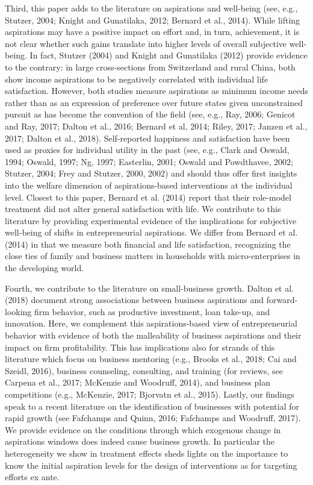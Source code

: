 \documentclass[11.5pt]{article}
\begin{document}
Third, this paper adds to the literature on aspirations and well-being (see, e.g., Stutzer, 2004; Knight and Gunatilaka, 2012; Bernard et al., 2014). While lifting aspirations may have a positive impact on effort and, in turn, achievement, it is not clear whether such gains translate into higher levels of overall subjective well-being. In fact, Stutzer (2004) and Knight and Gunatilaka (2012) provide evidence to the contrary: in large cross-sections from Switzerland and rural China, both show income aspirations to be negatively correlated with individual life satisfaction. However, both studies measure aspirations as minimum income needs rather than as an expression of preference over future states given unconstrained pursuit as has become the convention of the field (see, e.g., Ray, 2006; Genicot and Ray, 2017; Dalton et al., 2016; Bernard et al, 2014; Riley, 2017; Janzen et al., 2017; Dalton et al., 2018). Self-reported happiness and satisfaction have been used as proxies for individual utility in the past (see, e.g., Clark and Oswald, 1994; Oswald, 1997; Ng, 1997; Easterlin, 2001; Oswald and Powdthavee, 2002; Stutzer, 2004; Frey and Stutzer, 2000, 2002) %
and should thus offer first insights into the welfare dimension of aspirations-based interventions at the individual level. Closest to this paper, Bernard et al. (2014) report that their role-model treatment did not alter general satisfaction with life. We contribute to this literature by providing experimental evidence of the implications for subjective well-being of shifts in entrepreneurial aspirations. We differ from Bernard et al. (2014) in that we measure both financial and life satisfaction, recognizing the close ties of family and business matters in households with micro-enterprises in the developing world.

Fourth, we contribute to the literature on small-business growth. Dalton et al. (2018) document strong associations between business aspirations and forward-looking firm behavior, such as productive investment, loan take-up, and innovation. Here, we complement this aspirations-based view of entrepreneurial behavior with evidence of both the malleability of business aspirations and their impact on firm profitability. This has implications also for strands of this literature which focus on business mentoring (e.g., Brooks et al., 2018; Cai and Szeidl, 2016), business counseling, consulting, and training (for reviews, see Carpena et al., 2017; McKenzie and Woodruff, 2014), and business plan competitions (e.g., McKenzie, 2017; Bjorvatn et al., 2015). Lastly, our findings speak to a recent literature on the identification of businesses with potential for rapid growth (see Fafchamps and Quinn, 2016; Fafchamps and Woodruff, 2017). We provide evidence on the conditions through which exogenous change in aspirations windows does indeed cause business growth. In particular the heterogeneity we show in treatment effects sheds lights on the importance to know the initial aspiration levels for the design of interventions as for targeting efforts ex ante.
\end{document}

